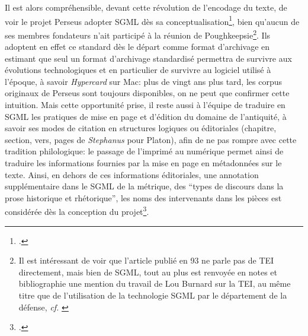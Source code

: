 Il est alors compréhensible, devant cette révolution de l'encodage du texte, de voir le projet Perseus adopter SGML dès sa conceptualisation\footcite[p. 138]{mylonas_perseus_1993}, bien qu'aucun de ses membres fondateurs n'ait participé à la réunion de Poughkeepsie\footnote{Il est intéressant de voir que l'article publié en 93 ne parle pas de TEI directement, mais bien de SGML, tout au plus est renvoyée en notes et bibliographie une mention du travail de Lou Burnard sur la TEI, au même titre que de l'utilisation de la technologie SGML par le département de la défense, \textit{cf.} \cite[notes 8 et 9, p.~155]{mylonas_perseus_1993}}. Ils adoptent en effet ce standard dès le départ comme format d'archivage en estimant que seul un format d'archivage standardisé permettra de survivre aux évolutions technologiques et en particulier de survivre au logiciel utilisé à l'époque, à savoir \textit{Hypercard} sur Mac: plus de vingt ans plus tard, les corpus originaux de Perseus sont toujours disponibles, on ne peut que confirmer cette intuition. Mais cette opportunité prise, il reste aussi à l'équipe de traduire en SGML les pratiques de mise en page et d'édition du domaine de l'antiquité, à savoir ses modes de citation en structures logiques ou éditoriales (chapitre, section, vers, pages de \textit{Stephanus} pour Platon), afin de ne pas rompre avec cette tradition philologique: le passage de l'imprimé au numérique permet ainsi de traduire les informations fournies par la mise en page en métadonnées sur le texte. Ainsi, en dehors de ces informations éditoriales, une annotation supplémentaire dans le SGML de la métrique, des \enquote{types de discours dans la prose historique et rhétorique}, les noms des intervenants dans les pièces est considérée dès la conception du projet\footcite[p. 137]{mylonas_perseus_1993}.

